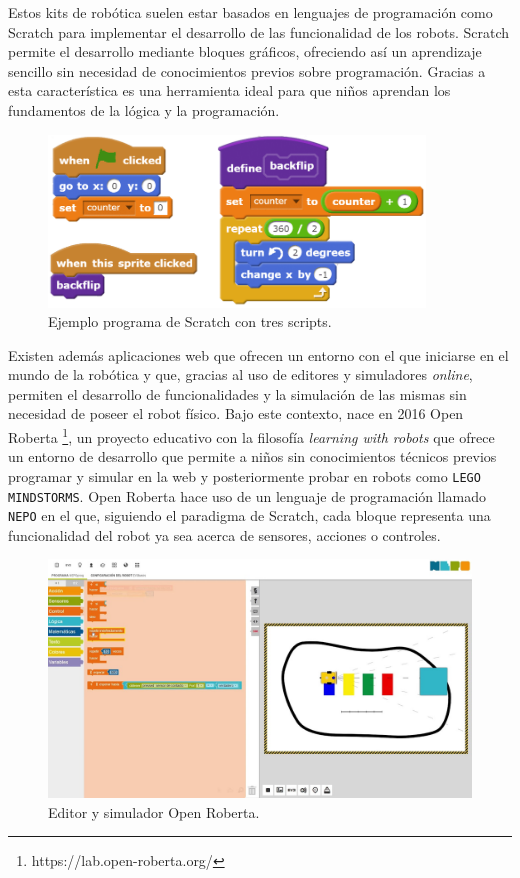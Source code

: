 \documentclass[a4paper, 12pt]{book}
\begin{document}
		Estos kits de robótica suelen estar basados en lenguajes de programación como Scratch para implementar el desarrollo de las funcionalidad de los robots. Scratch permite el desarrollo mediante bloques gráficos, ofreciendo así un aprendizaje sencillo sin necesidad de conocimientos previos sobre programación. Gracias a esta característica es una herramienta ideal para que niños aprendan los fundamentos de la lógica y la programación.
		
		\begin{figure}[H]
			\centering
			\includegraphics[width=10cm, keepaspectratio]{img/scratch.png}
			\caption{Ejemplo programa de Scratch con tres scripts.}
			\label{fig:scratch}
		\end{figure}
		
		Existen además aplicaciones web que ofrecen un entorno con el que iniciarse en el mundo de la robótica y que, gracias al uso de editores y simuladores \textit{online}, permiten el desarrollo de funcionalidades y la simulación de las mismas sin necesidad de poseer el robot físico. Bajo este contexto, nace en 2016 Open Roberta \footnote{https://lab.open-roberta.org/}, un proyecto educativo con la filosofía \textit{learning with robots} que ofrece un entorno de desarrollo que permite a niños sin conocimientos técnicos previos programar y simular en la web y posteriormente probar en robots como \texttt{LEGO MINDSTORMS}. Open Roberta hace uso de un lenguaje de programación llamado \texttt{NEPO} en el que, siguiendo el paradigma de Scratch, cada bloque representa una funcionalidad del robot ya sea acerca de sensores, acciones o controles. \\
		
		\begin{figure}[H]
			\centering
			\includegraphics[width=13cm, keepaspectratio]{img/open_roberta.jpg}
			\caption{Editor y simulador Open Roberta.}
			\label{fig:open_roberta}
		\end{figure}
		
\end{document}
